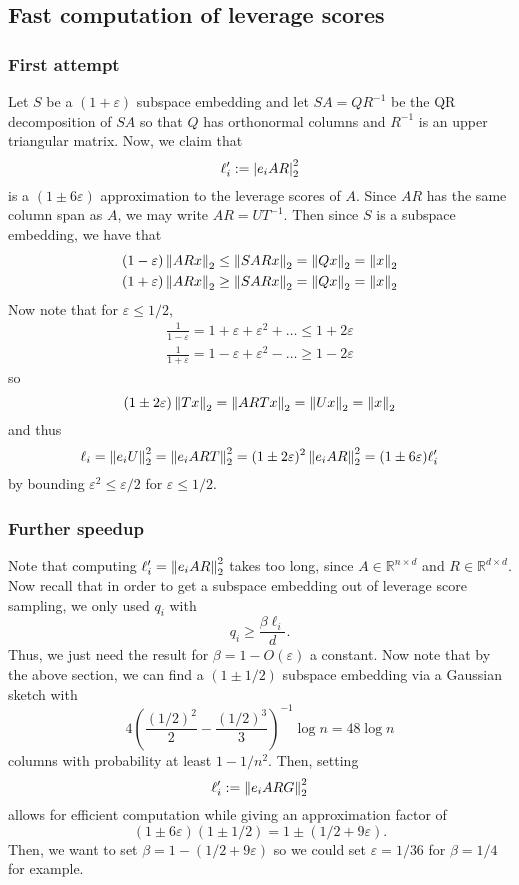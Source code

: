\documentclass{article}
\begin{document}
\subsection{Fast computation of leverage scores}
\subsubsection{First attempt}
Let $S$ be a $(1+\varepsilon)$ subspace embedding and let $SA = QR^{-1}$ be the QR decomposition of $SA$ so that $Q$ has orthonormal columns and $R^{-1}$ is an upper triangular matrix. Now, we claim that
\[
	\ell_i' := \left\vert e_iAR\right\vert_2^2
\]
is a $(1\pm 6\varepsilon)$ approximation to the leverage scores of $A$. Since $AR$ has the same column span as $A$, we may write $AR = UT^{-1}$. Then since $S$ is a subspace embedding, we have that
\begin{align*}
	(1-\varepsilon)\left\Vert ARx\right\Vert_2\leq\left\Vert SARx\right\Vert_2 = \left\Vert Qx\right\Vert_2 = \left\Vert x\right\Vert_2 \\
	(1+\varepsilon)\left\Vert ARx\right\Vert_2\geq\left\Vert SARx\right\Vert_2 = \left\Vert Qx\right\Vert_2 = \left\Vert x\right\Vert_2
\end{align*}
Now note that for $\varepsilon\leq1/2$,
\begin{align*}
	\frac1{1-\varepsilon} = 1+\varepsilon+\varepsilon^2+\dots\leq 1+2\varepsilon \\
	\frac1{1+\varepsilon} = 1-\varepsilon+\varepsilon^2-\dots\geq 1-2\varepsilon
\end{align*}
so
\[
	(1\pm2\varepsilon)\left\Vert Tx\right\Vert_2 = \left\Vert ARTx\right\Vert_2 = \left\Vert Ux\right\Vert_2 = \left\Vert x\right\Vert_2
\]
and thus
\[
	\ell_i = \left\Vert e_iU\right\Vert_2^2 = \left\Vert e_iART\right\Vert_2^2 = (1\pm2\varepsilon)^2\left\Vert e_iAR\right\Vert_2^2 = (1\pm6\varepsilon)\ell_i'
\]
by bounding $\varepsilon^2\leq\varepsilon/2$ for $\varepsilon\leq1/2$. 

\subsubsection{Further speedup}
Note that computing $\ell_i' = \left\Vert e_i AR\right\Vert_2^2$ takes too long, since $A\in\mathbb R^{n\times d}$ and $R\in\mathbb R^{d\times d}$. Now recall that in order to get a subspace embedding out of leverage score sampling, we only used $q_i$ with
\[
	q_i\geq \frac{\beta\ell_i}{d}.
\]
Thus, we just need the result for $\beta = 1-O(\varepsilon)$ a constant. Now note that by the above section, we can find a $(1\pm1/2)$ subspace embedding via a Gaussian sketch with
\[
	4\left(\frac{(1/2)^2}2 - \frac{(1/2)^3}3\right)^{-1}\log n = 48\log n
\]
columns with probability at least $1-1/n^2$. Then, setting
\[
	\ell_i' := \left\Vert e_i ARG\right\Vert_2^2
\]
allows for efficient computation while giving an approximation factor of
\[
	(1\pm6\varepsilon)(1\pm1/2) = 1\pm(1/2+9\varepsilon).
\]
Then, we want to set $\beta = 1-(1/2+9\varepsilon)$ so we could set $\varepsilon = 1/36$ for $\beta = 1/4$ for example. 
\end{document}
